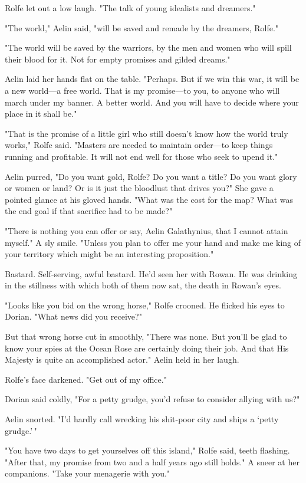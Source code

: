 Rolfe let out a low laugh. "The talk of young idealists and dreamers."

"The world," Aelin said, "will be saved and remade by the dreamers, Rolfe."

"The world will be saved by the warriors, by the men and women who will spill their blood for it. Not for empty promises and gilded dreams."

Aelin laid her hands flat on the table. "Perhaps. But if we win this war, it will be a new world---a free world. That is my promise---to you, to anyone who will march under my banner. A better world. And you will have to decide where your place in it shall be."

"That is the promise of a little girl who still doesn't know how the world truly works," Rolfe said. "Masters are needed to maintain order---to keep things running and profitable. It will not end well for those who seek to upend it."

Aelin purred, "Do you want gold, Rolfe? Do you want a title? Do you want glory or women or land? Or is it just the bloodlust that drives you?" She gave a pointed glance at his gloved hands. "What was the cost for the map? What was the end goal if that sacrifice had to be made?"

"There is nothing you can offer or say, Aelin Galathynius, that I cannot attain myself." A sly smile. "Unless you plan to offer me your hand and make me king of your territory  which might be an interesting proposition."

Bastard. Self-serving, awful bastard. He'd seen her with Rowan. He was drinking in the stillness with which both of them now sat, the death in Rowan's eyes.

"Looks like you bid on the wrong horse," Rolfe crooned. He flicked his eyes to Dorian. "What news did you receive?"

But that wrong horse cut in smoothly, "There was none. But you'll be glad to know your spies at the Ocean Rose are certainly doing their job. And that His Majesty is quite an accomplished actor." Aelin held in her laugh.

Rolfe's face darkened. "Get out of my office."

Dorian said coldly, "For a petty grudge, you'd refuse to consider allying with us?"

Aelin snorted. "I'd hardly call wrecking his shit-poor city and ships a
`petty grudge.'\,"

"You have two days to get yourselves off this island," Rolfe said, teeth flashing. "After that, my promise from two and a half years ago still holds." A sneer at her companions. "Take your  menagerie with you."


